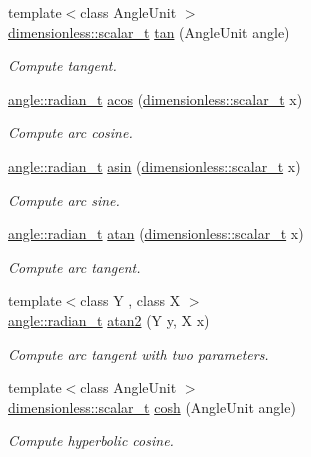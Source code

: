 \begin{DoxyCompactItemize}
{\footnotesize template$<$class Angle\+Unit $>$ }\\\hyperlink{classunits_1_1unit__t}{dimensionless\+::scalar\+\_\+t} \hyperlink{group___unit_math_ga0b15a6cb2112c8a8b9ce7f8ece1e802f}{tan} (Angle\+Unit angle)
\begin{DoxyCompactList}\small\item\em Compute tangent. \end{DoxyCompactList}\item 
\hyperlink{classunits_1_1unit__t}{angle\+::radian\+\_\+t} \hyperlink{group___unit_math_ga1212499531eea8c3b6ba642450e5b30b}{acos} (\hyperlink{classunits_1_1unit__t}{dimensionless\+::scalar\+\_\+t} x)
\begin{DoxyCompactList}\small\item\em Compute arc cosine. \end{DoxyCompactList}\item 
\hyperlink{classunits_1_1unit__t}{angle\+::radian\+\_\+t} \hyperlink{group___unit_math_gad3af1ed635b304a85337b890d71c0779}{asin} (\hyperlink{classunits_1_1unit__t}{dimensionless\+::scalar\+\_\+t} x)
\begin{DoxyCompactList}\small\item\em Compute arc sine. \end{DoxyCompactList}\item 
\hyperlink{classunits_1_1unit__t}{angle\+::radian\+\_\+t} \hyperlink{group___unit_math_ga8d82edb60d8f0ab9efc2f7581457bb3e}{atan} (\hyperlink{classunits_1_1unit__t}{dimensionless\+::scalar\+\_\+t} x)
\begin{DoxyCompactList}\small\item\em Compute arc tangent. \end{DoxyCompactList}\item 
{\footnotesize template$<$class Y , class X $>$ }\\\hyperlink{classunits_1_1unit__t}{angle\+::radian\+\_\+t} \hyperlink{group___unit_math_ga888f6c083879b6892faf6ab73f8fc9a1}{atan2} (Y y, X x)
\begin{DoxyCompactList}\small\item\em Compute arc tangent with two parameters. \end{DoxyCompactList}\item 
{\footnotesize template$<$class Angle\+Unit $>$ }\\\hyperlink{classunits_1_1unit__t}{dimensionless\+::scalar\+\_\+t} \hyperlink{group___unit_math_gad2f3a2b64b638d499d840a933774422b}{cosh} (Angle\+Unit angle)
\begin{DoxyCompactList}\small\item\em Compute hyperbolic cosine. \end{DoxyCompactList}\item 

\end{DoxyCompactItemize}
